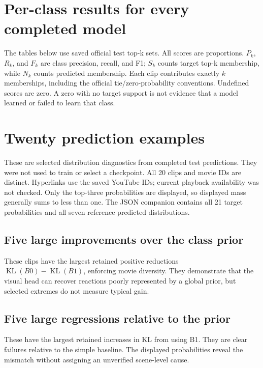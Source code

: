 \documentclass[11pt,a4paper]{article}
\newcommand{\tbl}[1]{\FloatBarrier}
\newcommand{\KL}{\operatorname{KL}}
\begin{document}
\clearpage
\section{Per-class results for every completed model}\label{app:classes}
The tables below use saved official test top-k sets. All scores are proportions. $P_k$, $R_k$, and $F_k$ are class precision, recall, and F1; $S_k$ counts target top-k membership, while $N_k$ counts predicted membership. Each clip contributes exactly $k$ memberships, including the official tie/zero-probability conventions. Undefined scores are zero. A zero with no target support is not evidence that a model learned or failed to learn that class.
\tbl{classes_b0_prior}
\tbl{classes_b1_meanpool}
\tbl{classes_b2_temporal}
\tbl{classes_b2_set_control}
\tbl{classes_a5_distribution}
\tbl{classes_e_reaction_query}
\tbl{classes_e_shared_query_control}


\clearpage
\section{Twenty prediction examples}\label{app:examples}
These are selected distribution diagnostics from completed test predictions. They were not used to train or select a checkpoint. All 20 clips and movie IDs are distinct. Hyperlinks use the saved YouTube IDs; current playback availability was not checked. Only the top-three probabilities are displayed, so displayed mass generally sums to less than one. The JSON companion contains all 21 target probabilities and all seven reference predicted distributions.

\subsection{Five large improvements over the class prior}
These clips have the largest retained positive reductions $\KL(B0)-\KL(B1)$, enforcing movie diversity. They demonstrate that the visual head can recover reactions poorly represented by a global prior, but selected extremes do not measure typical gain.

\clearpage
\subsection{Five large regressions relative to the prior}
These have the largest retained increases in KL from using B1. They are clear failures relative to the simple baseline. The displayed probabilities reveal the mismatch without assigning an unverified scene-level cause.

\clearpage
\end{document}
